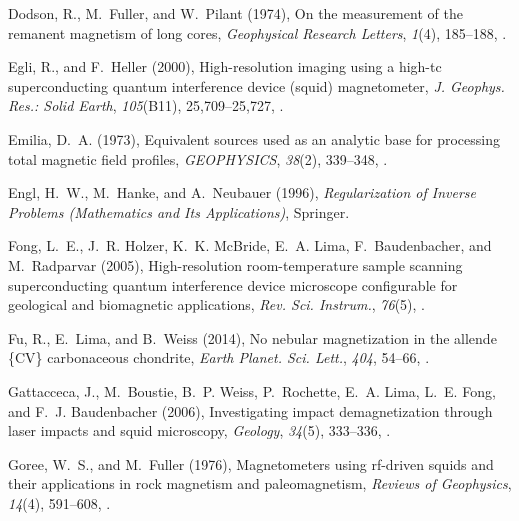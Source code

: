 \documentclass[draft,gc]{agutex}
\begin{document}
\begin{article}
\begin{thebibliography}{56}
Dodson, R., M.~Fuller, and W.~Pilant (1974), On the measurement of the remanent
  magnetism of long cores, \textit{Geophysical Research Letters},
  \textit{1}(4), 185--188, .

Egli, R., and F.~Heller (2000), High-resolution imaging using a high-tc
  superconducting quantum interference device (squid) magnetometer, \textit{J.
  Geophys. Res.: Solid Earth}, \textit{105}(B11), 25,709--25,727,
  .

Emilia, D.~A. (1973), Equivalent sources used as an analytic base for
  processing total magnetic field profiles, \textit{GEOPHYSICS},
  \textit{38}(2), 339--348, .

Engl, H.~W., M.~Hanke, and A.~Neubauer (1996), \textit{Regularization of
  Inverse Problems (Mathematics and Its Applications)}, Springer.

Fong, L.~E., J.~R. Holzer, K.~K. McBride, E.~A. Lima, F.~Baudenbacher, and
  M.~Radparvar (2005), High-resolution room-temperature sample scanning
  superconducting quantum interference device microscope configurable for
  geological and biomagnetic applications, \textit{Rev. Sci. Instrum.},
  \textit{76}(5), .

Fu, R., E.~Lima, and B.~Weiss (2014), No nebular magnetization in the allende
  \{CV\} carbonaceous chondrite, \textit{Earth Planet. Sci. Lett.},
  \textit{404}, 54--66, .

Gattacceca, J., M.~Boustie, B.~P. Weiss, P.~Rochette, E.~A. Lima, L.~E. Fong,
  and F.~J. Baudenbacher (2006), Investigating impact demagnetization through
  laser impacts and squid microscopy, \textit{Geology}, \textit{34}(5),
  333--336, .

Goree, W.~S., and M.~Fuller (1976), Magnetometers using rf-driven squids and
  their applications in rock magnetism and paleomagnetism, \textit{Reviews of
  Geophysics}, \textit{14}(4), 591--608, .


\end{thebibliography}
\end{article}
\end{document}
